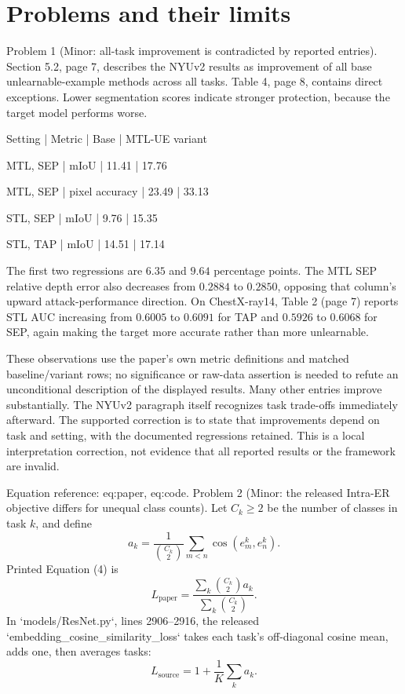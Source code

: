 \documentclass[10pt]{article}
\begin{document}
\section*{Problems and their limits}
Problem 1 (Minor: all-task improvement is contradicted by reported entries).  Section 5.2, page 7, describes the NYUv2 results as improvement of all base unlearnable-example methods across all tasks. Table 4, page 8, contains direct exceptions. Lower segmentation scores indicate stronger protection, because the target model performs worse.\par
Setting | Metric | Base | MTL-UE variant\par
MTL, SEP | mIoU | 11.41 | 17.76\par
MTL, SEP | pixel accuracy | 23.49 | 33.13\par
STL, SEP | mIoU | 9.76 | 15.35\par
STL, TAP | mIoU | 14.51 | 17.14\par
The first two regressions are \(6.35\) and \(9.64\) percentage points. The MTL SEP relative depth error also decreases from \(0.2884\) to \(0.2850\), opposing that column’s upward attack-performance direction. On ChestX-ray14, Table 2 (page 7) reports STL AUC increasing from \(0.6005\) to \(0.6091\) for TAP and \(0.5926\) to \(0.6068\) for SEP, again making the target more accurate rather than more unlearnable.\par
These observations use the paper’s own metric definitions and matched baseline/variant rows; no significance or raw-data assertion is needed to refute an unconditional description of the displayed results. Many other entries improve substantially. The NYUv2 paragraph itself recognizes task trade-offs immediately afterward. The supported correction is to state that improvements depend on task and setting, with the documented regressions retained. This is a local interpretation correction, not evidence that all reported results or the framework are invalid.\par
Equation reference: eq:paper, eq:code. Problem 2 (Minor: the released Intra-ER objective differs for unequal class counts).  Let \(C_k\ge2\) be the number of classes in task \(k\), and define \[a_k=\frac{1}{\binom{C_k}{2}}
       \sum_{m<n}\cos(e_m^k,e_n^k).\] Printed Equation (4) is \[
 L_{\mathrm{paper}}=
 \frac{\sum_k\binom{C_k}{2}a_k}{\sum_k\binom{C_k}{2}}.\] In `models/ResNet.py`, lines 2906–2916, the released `embedding\_cosine\_similarity\_loss` takes each task’s off-diagonal cosine mean, adds one, then averages tasks: \[
 L_{\mathrm{source}}=1+\frac1K\sum_k a_k.\]\par
\end{document}
